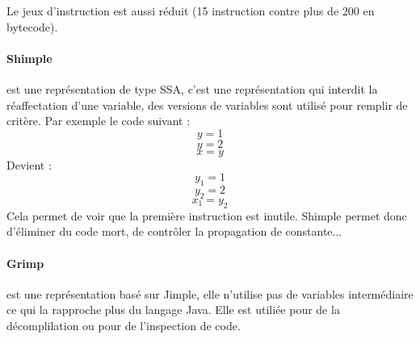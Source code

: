 Le jeux d'instruction est aussi réduit (15 instruction contre plus de 200 en bytecode).
\paragraph{Shimple} est une représentation de type \gls{SSA}, c'est une représentation qui interdit la réaffectation d'une variable, des versions de variables sont utilisé pour remplir de critère. Par exemple le code suivant :
$$ y = 1 $$
$$ y = 2 $$
$$ x = y $$
Devient :
$$ y_1 = 1 $$
$$ y_2 = 2 $$
$$ x_1 = y_2 $$ 
Cela permet de voir que la première instruction est inutile. Shimple permet donc d'éliminer du code mort, de contrôler la propagation de constante...

\paragraph{Grimp} est une représentation basé sur Jimple, elle n'utilise pas de variables intermédiaire ce qui la rapproche plus du langage Java. Elle est utiliée pour de la décomplilation ou pour de l'inspection de code.

\section{}

\paragraph{}